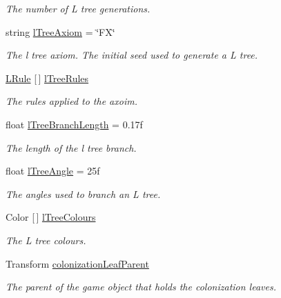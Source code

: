 \begin{DoxyCompactItemize}
\begin{DoxyCompactList}\small\item\em The number of L tree generations. \end{DoxyCompactList}\item 
string \hyperlink{class_fractal_tree_1_1_tree_builder_a0ed6efbc756277236c9b209ebcba829a}{l\+Tree\+Axiom} = \char`\"{}FX\char`\"{}
\begin{DoxyCompactList}\small\item\em The l tree axiom. The initial seed used to generate a L tree. \end{DoxyCompactList}\item 
\hyperlink{class_fractal_tree_1_1_l_rule}{L\+Rule} \mbox{[}$\,$\mbox{]} \hyperlink{class_fractal_tree_1_1_tree_builder_a725a1ff0ebe0fbbc78e22eedea80a50e}{l\+Tree\+Rules}
\begin{DoxyCompactList}\small\item\em The rules applied to the axoim. \end{DoxyCompactList}\item 
float \hyperlink{class_fractal_tree_1_1_tree_builder_a7416e2e2bea136c1406f79a98a8026ee}{l\+Tree\+Branch\+Length} = 0.\+17f
\begin{DoxyCompactList}\small\item\em The length of the l tree branch. \end{DoxyCompactList}\item 
float \hyperlink{class_fractal_tree_1_1_tree_builder_a10a0d2b7b57b98c4232ba414cdfa8436}{l\+Tree\+Angle} = 25f
\begin{DoxyCompactList}\small\item\em The angles used to branch an L tree. \end{DoxyCompactList}\item 
Color \mbox{[}$\,$\mbox{]} \hyperlink{class_fractal_tree_1_1_tree_builder_adf9df8010eaa8ed629b6e5210474b7eb}{l\+Tree\+Colours}
\begin{DoxyCompactList}\small\item\em The L tree colours. \end{DoxyCompactList}\item 
Transform \hyperlink{class_fractal_tree_1_1_tree_builder_a17c8e9ca6955ef3d2eadbf0fc54acfa3}{colonization\+Leaf\+Parent}
\begin{DoxyCompactList}\small\item\em The parent of the game object that holds the colonization leaves. \end{DoxyCompactList}\item 

\end{DoxyCompactItemize}

